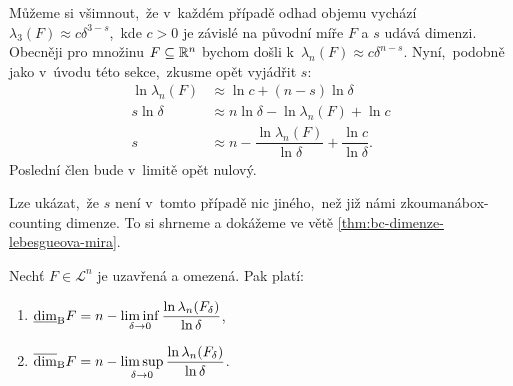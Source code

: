 Můžeme si všimnout,~že v~každém případě odhad objemu vychází $\lambda_3(F)\approx c\delta^{3-s}$,~kde $c>0$ je závislé na původní míře $F$ a $s$ udává dimenzi. Obecněji pro množinu $F\subseteq\mathbb{R}^n$ bychom došli k~$\lambda_n(F)\approx c\delta^{n-s}$. Nyní,~podobně jako v~úvodu této sekce,~zkusme opět vyjádřit $s$:
\begin{align*}
    \ln{\lambda_n(F)}&\approx\ln{c}+(n-s)\ln{\delta}\\
    s\ln{\delta}&\approx n\ln{\delta}-\ln{\lambda_n(F)}+\ln{c}\\
    s&\approx n-\dfrac{\ln{\lambda_n(F)}}{\ln{\delta}}+\dfrac{\ln{c}}{\ln{\delta}}.
\end{align*}
Poslední člen bude v~limitě opět nulový.

Lze ukázat,~že $s$ není v~tomto případě nic jiného,~než již námi zkoumaná\linebreak{}box-counting dimenze. To si shrneme a dokážeme ve větě \ref{thm:bc-dimenze-lebesgueova-mira}.
\begin{theorem}\label{thm:bc-dimenze-lebesgueova-mira}
    Nechť $F\in\mathcal{L}^n$ je uzavřená a omezená. Pak platí: 
    \begin{enumerate}[label=(\roman*)]
        \item $\underline{\dim}_\textup{B}{F}=n-\liminf\limits_{\delta\to 0}\dfrac{\ln{\lambda_n(F_\delta)}}{\ln{\delta}}$,
        \item $\overline{\dim}_\textup{B}{F}=n-\limsup\limits_{\delta\to 0}\dfrac{\ln{\lambda_n(F_\delta)}}{\ln{\delta}}$.
    \end{enumerate}
\end{theorem}
